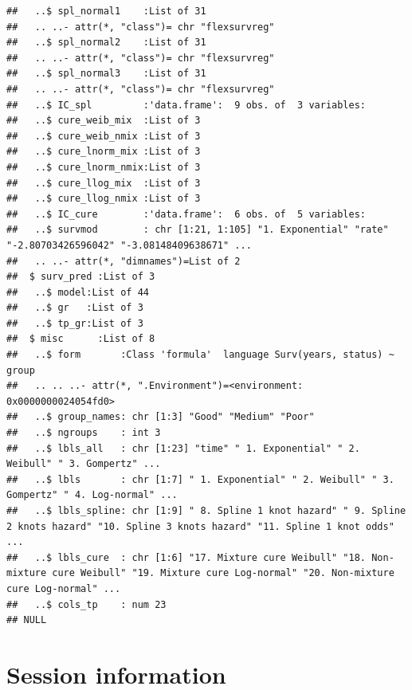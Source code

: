 \documentclass[]{article}
\begin{document}
\begin{verbatim}
##   ..$ spl_normal1    :List of 31
##   .. ..- attr(*, "class")= chr "flexsurvreg"
##   ..$ spl_normal2    :List of 31
##   .. ..- attr(*, "class")= chr "flexsurvreg"
##   ..$ spl_normal3    :List of 31
##   .. ..- attr(*, "class")= chr "flexsurvreg"
##   ..$ IC_spl         :'data.frame':  9 obs. of  3 variables:
##   ..$ cure_weib_mix  :List of 3
##   ..$ cure_weib_nmix :List of 3
##   ..$ cure_lnorm_mix :List of 3
##   ..$ cure_lnorm_nmix:List of 3
##   ..$ cure_llog_mix  :List of 3
##   ..$ cure_llog_nmix :List of 3
##   ..$ IC_cure        :'data.frame':  6 obs. of  5 variables:
##   ..$ survmod        : chr [1:21, 1:105] "1. Exponential" "rate" "-2.80703426596042" "-3.08148409638671" ...
##   .. ..- attr(*, "dimnames")=List of 2
##  $ surv_pred :List of 3
##   ..$ model:List of 44
##   ..$ gr   :List of 3
##   ..$ tp_gr:List of 3
##  $ misc      :List of 8
##   ..$ form       :Class 'formula'  language Surv(years, status) ~ group
##   .. .. ..- attr(*, ".Environment")=<environment: 0x0000000024054fd0> 
##   ..$ group_names: chr [1:3] "Good" "Medium" "Poor"
##   ..$ ngroups    : int 3
##   ..$ lbls_all   : chr [1:23] "time" " 1. Exponential" " 2. Weibull" " 3. Gompertz" ...
##   ..$ lbls       : chr [1:7] " 1. Exponential" " 2. Weibull" " 3. Gompertz" " 4. Log-normal" ...
##   ..$ lbls_spline: chr [1:9] " 8. Spline 1 knot hazard" " 9. Spline 2 knots hazard" "10. Spline 3 knots hazard" "11. Spline 1 knot odds" ...
##   ..$ lbls_cure  : chr [1:6] "17. Mixture cure Weibull" "18. Non-mixture cure Weibull" "19. Mixture cure Log-normal" "20. Non-mixture cure Log-normal" ...
##   ..$ cols_tp    : num 23
## NULL
\end{verbatim}

\newpage

\section{Session information}\label{session-information}
\end{document}
